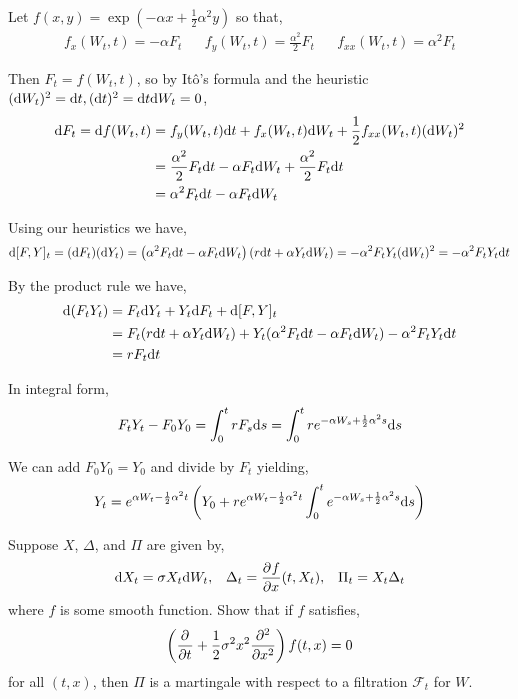 \documentclass[10pt]{article}
\begin{document}
\begin{solution}[Solution]
Let \( f(x,y) = \exp(-\alpha x + \frac{1}{2} \alpha^2 y) \) so that,
\begin{align*}
    f_x(W_t,t) = -\alpha F_t && f_y(W_t,t) = \frac{\alpha^2}{2} F_t && f_{xx}(W_t,t) =  \alpha^2 F_t
\end{align*}

Then \( F_t = f(W_t,t) \), so by It\^o's formula and the heuristic \( (\d W_t)^2 =\d t, (\d t)^2 = \d t \d W_t = 0 \),
\begin{align*}
    \d F_t = \d f(W_t,t) &= f_y(W_t,t) \d t +  f_x(W_t,t) \d W_t + \frac{1}{2} f_{xx}(W_t,t) (\d W_t)^2 
    \\&= \frac{\alpha^2}{2}  F_t \d t -\alpha F_t \d W_t + \frac{\alpha^2}{2} F_t \d t
    \\&= \alpha^2 F_t \d t- \alpha F_t \d W_t
\end{align*}


Using our heuristics we have,
\begin{align*}
    \d[F,Y]_t = (\d F_t)(\d Y_t) = \left( \alpha^2 F_t \d t - \alpha F_t \d W_t \right) \left( r \d t + \alpha Y_t \d W_t \right)
    = -\alpha^2 F_tY_t (\d W_t)^2 
    = -\alpha^2 F_tY_t \d t
\end{align*}


By the product rule we have,
\begin{align*}
    \d (F_tY_t) &=  F_t \d Y_t + Y_t \d F_t + \d[F,Y]_t
    \\&= F_t (r\d t+\alpha Y_t \d W_t) + Y_t (\alpha^2 F_t \d t-\alpha F_t \d W_t) - \alpha^2 F_t Y_t \d t
    \\&= r F_t \d t 
\end{align*}

In integral form,
\begin{align*}
    F_t Y_t - F_0Y_0 = \int_{0}^{t}r F_s \d s = \int_{0}^{t} r e^{-\alpha W_s + \frac{1}{2} \alpha^2 s} \d s
\end{align*}

We can add \( F_0Y_0 = Y_0 \) and divide by \( F_t \) yielding,
\begin{align*}
    Y_t = e^{\alpha W_t - \frac{1}{2} \alpha^2 t} \left( Y_0 + r e^{\alpha W_t - \frac{1}{2}\alpha^2 t} \int_{0}^{t} e^{-\alpha W_s + \frac{1}{2} \alpha^2 s} \d s \right)
\end{align*}
\end{solution}

\begin{problem}[Exercise 8.3]
Suppose \( X \), \( \Delta \), and \( \Pi \) are given by,
\begin{align*}
    \d X_t = \sigma X_t \d W_t, 
    && \Delta_t = \pp{f}{x} (t,X_t),
    && \Pi_t = X_t \Delta_t
\end{align*}
where \( f \) is some smooth function. Show that if \( f \) satisfies,
\begin{align*}
    \left( \pp{}{t} + \dfrac{1}{2}\sigma^2x^2 \pp[2]{}{x} \right) f(t,x) = 0
\end{align*}
    for all \( (t,x) \), then \( \Pi \) is a martingale with respect to a filtration \( \mathcal{F}_t \) for \( W \).
\end{problem}
\end{document}
